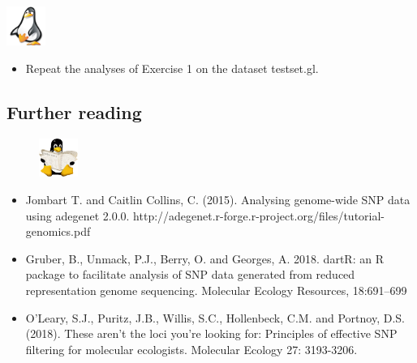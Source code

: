 \documentclass[
  letterpaper,
  DIV=11,
  numbers=noendperiod]{scrreprt}
\providecommand{\tightlist}{%
  \setlength{\itemsep}{0pt}\setlength{\parskip}{0pt}}\usepackage{longtable,booktabs,array}
\begin{document}
\begin{tcolorbox}[enhanced jigsaw, coltitle=black, colframe=quarto-callout-note-color-frame, colbacktitle=quarto-callout-note-color!10!white, breakable, bottomtitle=1mm, rightrule=.15mm, opacitybacktitle=0.6, left=2mm, arc=.35mm, opacityback=0, leftrule=.75mm, toptitle=1mm, titlerule=0mm, title=\textcolor{quarto-callout-note-color}{\faInfo}\hspace{0.5em}{Exercise 2: Filtering the Turtle dataset}, bottomrule=.15mm, toprule=.15mm, colback=white]

\includegraphics[width=0.5in,height=0.5in]{images/task.png}

\begin{itemize}
\tightlist
\item
  Repeat the analyses of Exercise 1 on the dataset testset.gl.
\end{itemize}

\end{tcolorbox}

\hypertarget{further-reading}{%
\subsection*{Further reading}\label{further-reading}}

\begin{figure}

\hfill{} \includegraphics[width=0.5in,height=0.5in]{images/reading.png}

\end{figure}

\begin{itemize}
\item
  Jombart T. and Caitlin Collins, C. (2015). Analysing genome-wide SNP
  data using adegenet 2.0.0.
  http://adegenet.r-forge.r-project.org/files/tutorial-genomics.pdf
\item
  Gruber, B., Unmack, P.J., Berry, O. and Georges, A. 2018. dartR: an R
  package to facilitate analysis of SNP data generated from reduced
  representation genome sequencing. Molecular Ecology Resources,
  18:691--699
\item
  O'Leary, S.J., Puritz, J.B., Willis, S.C., Hollenbeck, C.M. and
  Portnoy, D.S. (2018). These aren't the loci you're looking for:
  Principles of effective SNP filtering for molecular ecologists.
  Molecular Ecology 27: 3193-3206.
\end{itemize}
\end{document}
